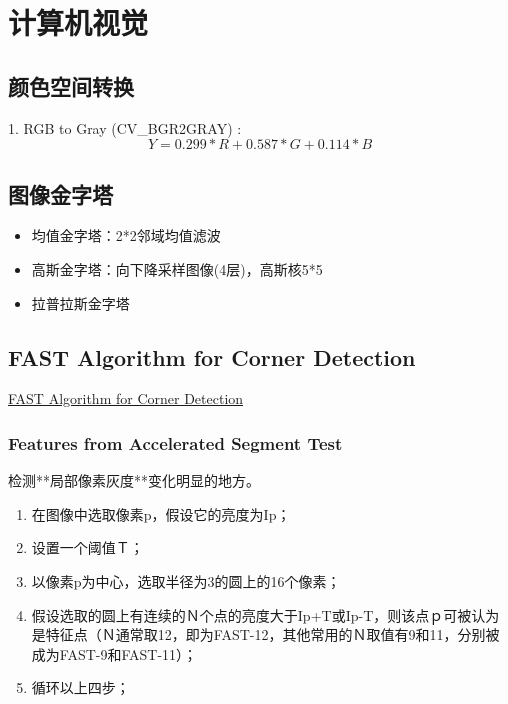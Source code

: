 \chapter{计算机视觉}

\section{颜色空间转换}
1. RGB to Gray (CV\_BGR2GRAY) :
\begin{equation} Y = 0.299*R + 0.587*G + 0.114*B \end{equation}

\section{图像金字塔}
\begin{itemize}
\item 均值金字塔：2*2邻域均值滤波
\item 高斯金字塔：向下降采样图像(4层)，高斯核5*5
\item 拉普拉斯金字塔
\end{itemize}

\section{FAST Algorithm for Corner Detection}

\href{https://docs.opencv.org/3.0-beta/doc/py_tutorials/py_feature2d/py_fast/py_fast.html}{FAST Algorithm for Corner Detection}

\subsection{Features from Accelerated Segment Test}
检测**局部像素灰度**变化明显的地方。
\begin{enumerate}   
\item 在图像中选取像素p，假设它的亮度为Ip；
\item 设置一个阈值Ｔ；
\item 以像素p为中心，选取半径为3的圆上的16个像素；
\item 假设选取的圆上有连续的Ｎ个点的亮度大于Ip+T或Ip-T，则该点ｐ可被认为是特征点（Ｎ通常取12，即为FAST-12，其他常用的Ｎ取值有9和11，分别被成为FAST-9和FAST-11）；
\item 循环以上四步；
\end{enumerate}


